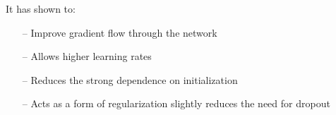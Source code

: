It has shown to:
\begin{itemize}
    \item[--] Improve gradient flow through the network
    \item[--] Allows higher learning rates
    \item[--] Reduces the strong dependence on initialization
    \item[--] Acts as a form of regularization slightly reduces the need for dropout
\end{itemize}{}


